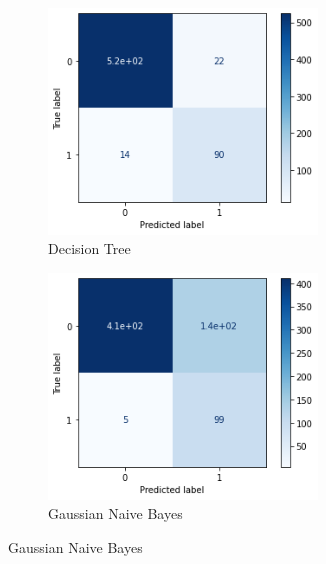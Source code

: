 \begin{figure}[H]
    \begin{subfigure}{0.5\textwidth}
        \includegraphics[width=0.9\linewidth, height=6cm]{img/cm/dt.png}
        \caption{Decision Tree}
        \label{fig:dt}
    \end{subfigure}
    \begin{subfigure}{0.5\textwidth}
        \includegraphics[width=0.9\linewidth, height=6cm]{img/cm/gnb.png}
        \caption{Gaussian Naive Bayes}
        \label{fig:gnb}
    \end{subfigure}
\end{figure}

